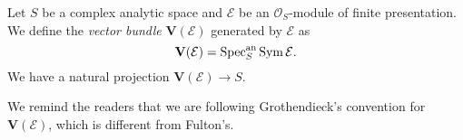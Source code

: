 \begin{definition}
    Let $S$ be a complex analytic space and $\mathcal{E}$ be an $\mathcal{O}_S$-module of finite presentation. We define the \emph{vector bundle} $\mathbf{V}(\mathcal{E})$ generated by $\mathcal{E}$ as
    \[
        \mathbf{V}(\mathcal{E})=\operatorname{Spec}^{\mathrm{an}}_S \operatorname{Sym} \mathcal{E}.
    \]
    We have a natural projection $\mathbf{V}(\mathcal{E})\rightarrow S$.
\end{definition}
We remind the readers that we are following Grothendieck's convention for $\mathbf{V}(\mathcal{E})$, which is different from Fulton's.


\printbibliography
